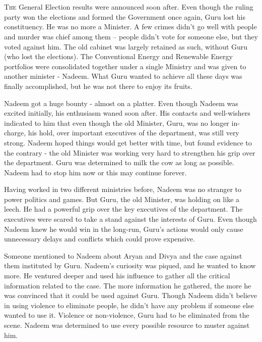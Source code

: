 \chapter{}

\lettrine{T}{he} General Election results were announced soon after. Even though the ruling
party won the elections and formed the Government once again, Guru lost his
constituency. He was no more a Minister. A few crimes didn't go well with people
and murder was chief among them – people didn't vote for someone else, but they
voted against him. The old cabinet was largely retained as such, without Guru
(who lost the elections). The Conventional Energy and Renewable Energy
portfolios were consolidated together under a single Ministry and was given to
another minister - Nadeem. What Guru wanted to achieve all these days was
finally accomplished, but he was not there to enjoy its fruits.

Nadeem got a huge bounty - almost on a platter. Even though Nadeem was excited
initially, his enthusiasm waned soon after. His contacts and well-wishers
indicated to him that even though the old Minister, Guru, was no longer
in-charge, his hold, over important executives of the department, was still very
strong. Nadeem hoped things would get better with time, but found evidence to
the contrary - the old Minister was working very hard to strengthen his grip
over the department. Guru was determined to milk the cow as long as possible.
Nadeem had to stop him now or this may continue forever.

Having worked in two different ministries before, Nadeem was no stranger to
power politics and games. But Guru, the old Minister, was holding on like a
leech. He had a powerful grip over the key executives of the department. The
executives were scared to take a stand against the interests of Guru. Even
though Nadeem knew he would win in the long-run, Guru's actions would only cause
unnecessary delays and conflicts which could prove expensive.

Someone mentioned to Nadeem about Aryan and Divya and the case against them
instituted by Guru. Nadeem's curiosity was piqued, and he wanted to know more. He
ventured deeper and used his influence to gather all the critical information
related to the case. The more information he gathered, the more he was convinced
that it could be used against Guru. Though Nadeem didn't believe in using
violence to eliminate people, he didn't have any problem if someone else wanted
to use it. Violence or non-violence, Guru had to be eliminated from the scene.
Nadeem was determined to use every possible resource to muster against him.

